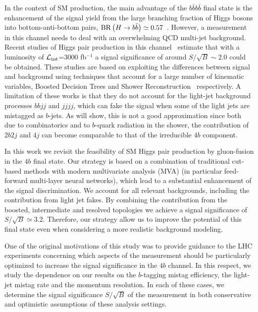 In the context of SM production,
the main advantage of the $b\bar{b}b\bar{b}$ final state is the
enhancement of the signal yield
from the large branching fraction of Higgs bosons into bottom-anti-bottom
pairs, ${\rm BR}\left( H\to b\bar{b}\right)\simeq 0.57$~\cite{Dittmaier:2012vm}.
%
However, a measurement in this channel
needs to deal with an overwhelming QCD multi-jet background.
%
Recent studies of Higgs pair production in this
channel~\cite{Wardrope:2014kya,deLima:2014dta}
estimate that with a luminosity of
$\mathcal{L}_{\rm int}$=3000 fb$^{-1}$ a signal significance of around $S/\sqrt{B}\sim 2.0$ could be obtained.
%
These studies are
based on exploiting the differences between signal and background
using techniques that account for a large number of kinematic
variables, Boosted Decision Trees
and Shower Reconstruction~\cite{Soper:2011cr} respectively.
%
A limitation of these works is that
they do not account
 for the light-jet background processes $bbjj$ and
$jjjj$, which can fake the signal when 
some of the light jets are mistagged as $b$-jets.
%
As will show, this is not a good approximation since both due to
combinatorics and to $b$-quark radiation in the shower, the
contribution of $2b2j$ and $4j$ can become comparable
to that of the irreducible $4b$ component.

In this work we revisit the feasibility of SM Higgs pair production by gluon-fusion
in the $4b$ final state.
%
 Our strategy is based on a combination of traditional cut-based
 methods with modern multivariate analysis (MVA)
 (in particular feed-forward multi-layer neural networks),
 which lead to a substantial
  enhancement of the signal discrimination.
  We account for  all relevant
  backgrounds, including the contribution from light jet fakes.
  By combining the contribution from the boosted, intermediate and resolved
  topologies we achieve a signal significance of $S/\sqrt{B}\simeq 3.2$.
%
  Therefore, our strategy allow us to improve the
  potential of this final state even when considering a
  more realistic background modeling.

  One of the original motivations of this study was to provide guidance to the
  LHC experiments
concerning which aspects of the measurement should be particularly optimized
to increase the signal significance in the $4b$ channel.
%
In this respect, we study the dependence on our results on the $
b$-tagging mistag
efficiency, the light-jet mistag rate and the 
momentum resolution.
%
In each of these cases, we determine the signal significance
$S/\sqrt{B}$ of the
measurement in both conservative and optimistic assumptions of these
analysis settings.


